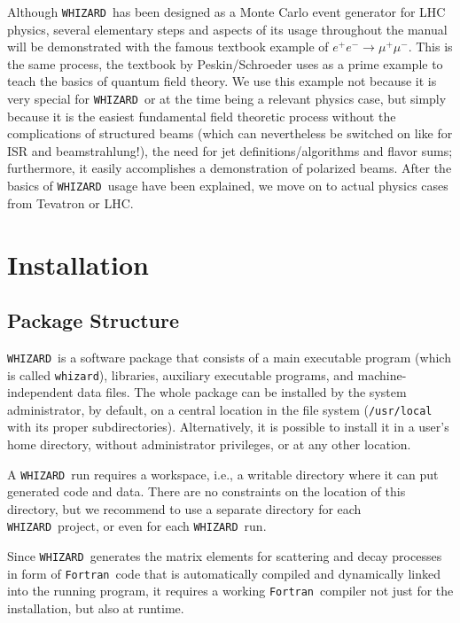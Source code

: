 \documentclass[12pt]{book}
\newcommand{\ttt}[1]{\texttt{#1}}
\newcommand{\whizard}{\texttt{WHIZARD}}
\newcommand{\fortran}{\texttt{Fortran}}
\begin{document}
Although \whizard\ has been designed as a Monte Carlo event generator
for LHC physics, several elementary steps and aspects of its usage
throughout the manual will be demonstrated with the famous textbook
example of $e^+e^- \to \mu^+ \mu^-$. This is the same process, the
textbook by Peskin/Schroeder \cite{PeskinSchroeder} uses as a prime
example to teach the basics of quantum field theory. We use this
example not because it is very special for \whizard\ or at the time
being a relevant physics case, but simply because it is the easiest
fundamental field theoretic process without the complications of
structured beams (which can nevertheless be switched on like for ISR
and beamstrahlung!), the need for jet definitions/algorithms and
flavor sums; furthermore, it easily accomplishes a demonstration of
polarized beams. After the basics of \whizard\ usage have been
explained, we move on to actual physics cases from Tevatron or LHC.    


\newpage
\chapter{Installation}

\section{Package Structure}

\whizard\ is a software package that consists of a main executable
program (which is called \ttt{whizard}), libraries, auxiliary
executable programs, and machine-independent data files.  The whole
package can be installed by the system administrator, by default, on a
central location in the file system (\ttt{/usr/local} with its proper
subdirectories).  Alternatively, it is possible to install it in a
user's home directory, without administrator privileges, or at any
other location.

A \whizard\ run requires a workspace, i.e., a writable directory where
it can put generated code and data.  There are no constraints on the
location of this directory, but we recommend to use a separate
directory for each \whizard\ project, or even for each \whizard\ run.

Since \whizard\ generates the matrix elements for scattering and decay
processes in form of \fortran\ code that is automatically compiled and
dynamically linked into the running program, it requires a working
\fortran\ compiler not just for the installation, but also at runtime.
\end{document}

